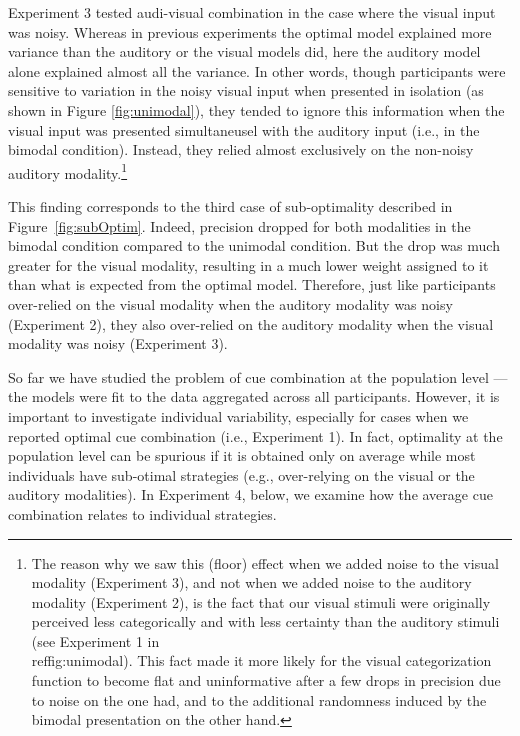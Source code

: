 \documentclass[english,,man,floatsintext]{apa6}
\let\rmarkdownfootnote\footnote%
\def\footnote{\protect\rmarkdownfootnote}
\theoremstyle{definition}
\theoremstyle{definition}
\theoremstyle{definition}
\theoremstyle{remark}
\begin{document}
Experiment 3 tested audi-visual combination in the case where the visual
input was noisy. Whereas in previous experiments the optimal model
explained more variance than the auditory or the visual models did, here
the auditory model alone explained almost all the variance. In other
words, though participants were sensitive to variation in the noisy
visual input when presented in isolation (as shown in Figure
\ref{fig:unimodal}), they tended to ignore this information when the
visual input was presented simultaneusel with the auditory input (i.e.,
in the bimodal condition). Instead, they relied almost exclusively on
the non-noisy auditory
modality.\footnote{The reason why we saw this (floor) effect when we added noise to the visual modality (Experiment 3), and not when we added noise to the auditory modality (Experiment 2), is the fact that our visual stimuli were originally perceived less categorically and with less certainty than the auditory stimuli (see Experiment 1 in \\ref{fig:unimodal}). This fact made it more likely for the visual categorization function to become flat and uninformative after a few drops in precision due to noise on the one had, and to the additional randomness induced by the bimodal presentation on the other hand.}

This finding corresponds to the third case of sub-optimality described
in Figure~\ref{fig:subOptim}. Indeed, precision dropped for both
modalities in the bimodal condition compared to the unimodal condition.
But the drop was much greater for the visual modality, resulting in a
much lower weight assigned to it than what is expected from the optimal
model. Therefore, just like participants over-relied on the visual
modality when the auditory modality was noisy (Experiment 2), they also
over-relied on the auditory modality when the visual modality was noisy
(Experiment 3).

So far we have studied the problem of cue combination at the population
level --- the models were fit to the data aggregated across all
participants. However, it is important to investigate individual
variability, especially for cases when we reported optimal cue
combination (i.e., Experiment 1). In fact, optimality at the population
level can be spurious if it is obtained only on average while most
individuals have sub-otimal strategies (e.g., over-relying on the visual
or the auditory modalities). In Experiment 4, below, we examine how the
average cue combination relates to individual strategies.
\end{document}
